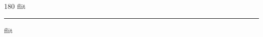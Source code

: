 
\begin{frame}
\begin{center}
\begin{turn}{180}
{\fontsize{2.5cm}{1em}\selectfont flit}
\end{turn}
\vspace{1em}\par  
\hrule
\vspace{1em}\par  
{\fontsize{2.5cm}{1em}\selectfont flit}
\end{center}
\end{frame}
